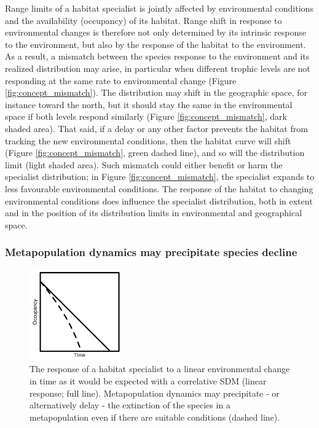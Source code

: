 \documentclass[12pt]{article}
\begin{document}
Range limits of a habitat specialist is jointly affected by
environmental conditions and the availability (occupancy) of its
habitat. Range shift in response to environmental changes is therefore
not only determined by its intrinsic response to the environment, but
also by the response of the habitat to the environment. As a result, a
mismatch between the species response to the environment and its
realized distribution may arise, in particular when different trophic
levels are not responding at the same rate to environmental change
(Figure \ref{fig:concept_mismatch}). The distribution may shift in the
geographic space, for instance toward the north, but it should stay the
same in the environmental space if both levels respond similarly (Figure
\ref{fig:concept_mismatch}, dark shaded area). That said, if a delay or
any other factor prevents the habitat from tracking the new
environmental conditions, then the habitat curve will shift (Figure
\ref{fig:concept_mismatch}, green dashed line), and so will the
distribution limit (light shaded area). Such mismatch could either
benefit or harm the specialist distribution; in Figure
\ref{fig:concept_mismatch}, the specialist expands to less favourable
environmental conditions. The response of the habitat to changing
environmental conditions does influence the specialist distribution,
both in extent and in the position of its distribution limits in
environmental and geographical space.

\hypertarget{metapopulation-dynamics-may-precipitate-species-decline}{%
\subsubsection{Metapopulation dynamics may precipitate species
decline}\label{metapopulation-dynamics-may-precipitate-species-decline}}

\begin{figure}
\hypertarget{fig:concept_metapop}{%
\centering
\includegraphics[width=0.35\textwidth,height=\textheight]{./manuscript/img/concept_metapopEffect.png}
\caption{The response of a habitat specialist to a linear environmental
change in time as it would be expected with a correlative SDM (linear
response; full line). Metapopulation dynamics may precipitate - or
alternatively delay - the extinction of the species in a metapopulation
even if there are suitable conditions (dashed
line).}\label{fig:concept_metapop}
}
\end{figure}
\end{document}
